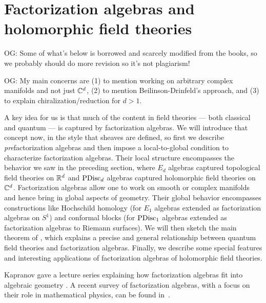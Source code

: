 \documentclass[11pt]{amsart}
\def\owen#1{{\textcolor{violet!50!black}{OG: {#1}}}}
\begin{document}
\section{Factorization algebras and holomorphic field theories}
\label{sec: fact alg}

\owen{Some of what's below is borrowed and scarcely modified from the books, so we probably should do more revision so it's not plagiarism!}

\owen{My main concerns are (1) to mention working on arbitrary complex manifolds and not just $\mathbb C^d$, (2) to mention Beilinson-Drinfeld's approach, and (3) to explain chiralization/reduction for $d > 1$.}

A key idea for us is that much of the content in field theories --- both classical and quantum --- is captured by factorization algebras.
We will introduce that concept now, in the style that sheaves are defined, so first we describe {\em pre}\/factorization algebras and then impose a local-to-global condition to characterize factorization algebras.
Their local structure encompasses the behavior we saw in the preceding section, where $E_d$ algebras captured topological field theories on $\mathbb R^d$ and ${\rm PDisc}_d$ algebras captured holomorphic field theories on~$\mathbb C^d$.
Factorization algebras allow one to work on smooth or complex manifolds and hence bring in global aspects of geometry.
Their global behavior encompasses constructions like Hochschild homology (for $E_1$ algebras extended as factorization algebras on $S^1$) and conformal blocks (for ${\rm PDisc}_1$ algebras extended as factorization algebras to Riemann surfaces).
We will then sketch the main theorem of \cite{CG2}, 
which explains a precise and general relationship between quantum field theories and factorization algebras.
Finally, we describe some special features and interesting applications of factorization algebras of holomorphic field theories.

Kapranov gave a lecture series explaining how factorization algebras fit into algebraic geometry \cite{KapLect}.
A recent survey of factorization algebras, with a focus on their role in mathematical physics, can be found in~\cite{CosGwEMP}.
\end{document}

